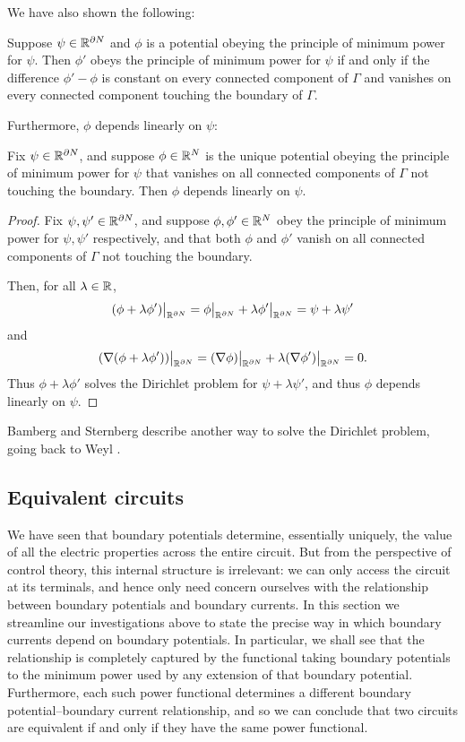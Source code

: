 We have also shown the following:

\begin{proposition}\label{dirichlet_problem_2}
Suppose $\psi \in {\mathbb{R}}^{\partial N}$ and $\phi$ is a potential obeying the principle of minimum power for $\psi$.  Then $\phi'$ obeys the principle of minimum power for $\psi$ if and only if the difference $\phi' - \phi$ is constant on every connected component of $\Gamma$ and vanishes on every connected component touching the boundary of $\Gamma$.
\end{proposition}

Furthermore, $\phi$ depends linearly on $\psi$:

\begin{proposition}\label{dirichlet_problem_3: linearity}
Fix $\psi \in {\mathbb{R}}^{\partial N}$, and suppose $\phi \in {\mathbb{R}}^N$ is the unique potential obeying the principle of minimum power for $\psi$ that vanishes on all connected components of $\Gamma$ not touching the boundary. Then $\phi$ depends linearly on $\psi$.
\end{proposition}
\begin{proof}
Fix $\psi, \psi' \in {\mathbb{R}}^{\partial N}$, and suppose $\phi, \phi' \in {\mathbb{R}}^N$ obey the principle of minimum power for $\psi,\psi'$ respectively, and that both $\phi$ and $\phi'$ vanish on all connected components of $\Gamma$ not touching the boundary. 

Then, for all $\lambda \in {\mathbb{R}}$,
\[
(\phi+\lambda\phi')\big|_{{\mathbb{R}}^{\partial N}} = \phi\big|_{{\mathbb{R}}^{\partial N}} +
\lambda\phi'\big|_{{\mathbb{R}}^{\partial N}}  = \psi + \lambda\psi'
\]
and
\[
(\nabla(\phi+\lambda\phi'))\big|_{{\mathbb{R}}^{\partial N}} = 
(\nabla\phi)\big|_{{\mathbb{R}}^{\partial N}} +
\lambda(\nabla\phi')\big|_{{\mathbb{R}}^{\partial N}}  = 0.
\]
Thus $\phi+\lambda\phi'$ solves the Dirichlet problem for $\psi+\lambda\psi'$, and thus $\phi$ depends linearly on $\psi$.
\end{proof}

Bamberg and Sternberg \cite{BS} describe another way to solve the Dirichlet problem, going back to Weyl \cite{Weyl}.

\subsection{Equivalent circuits}

We have seen that boundary potentials determine, essentially uniquely, the value of all the electric properties across the entire circuit. But from the perspective of control theory, this internal structure is irrelevant: we can only access the circuit at its terminals, and hence only need concern ourselves with the relationship between boundary potentials and boundary currents. In this section we streamline our investigations above to state the precise way in which boundary currents depend on boundary potentials. In particular, we shall see that the relationship is completely captured by the functional taking boundary potentials to the minimum power used by any extension of that boundary potential. Furthermore, each such power functional determines a different boundary potential--boundary current relationship, and so we can conclude that two circuits are equivalent if and only if they have the same power functional. 

